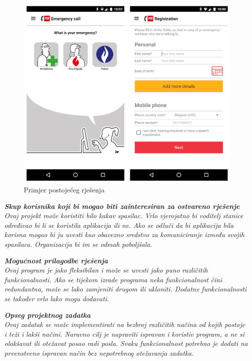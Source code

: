 		\begin{figure}[H]
			\includegraphics[scale=0.5]{slike/112-app-options.PNG}
			\centering
			\caption{Primjer postojećeg rješenja}
			\label{fig:112_BE}
			\end{figure}
		
		\textbf{\textit{Skup korisnika koji bi mogao biti zainteresiran za ostvareno rješenje}}\\
		\textit{Ovaj projekt može koristiti bilo kakav spasilac. Vrlo vjerojatno bi voditelj stanice određivao bi li se koristila aplikacija ili ne. Ako se odluči da bi aplikacija bila korisna mogao bi ju uvesti kao obavezno sredstvo za komuniciranje između svojih spasilaca. Organizacija bi im se odmah poboljšala.}
		
		\textbf{\textit{Mogućnost prilagodbe rješenja}}\\
		\textit{Ovaj program je jako fleksibilan i može se uvesti jako puno različitih funkcionalnosti. Ako se tijekom izrade programa neka funkcionalnost čini redundantna, može se lako zamjeniti drugom ili ukloniti. Dodatne funkcionalnosti se također vrlo lako mogu dodavati.}
		
		\textbf{\textit{Opseg projektnog zadatka}}\\
		\textit{Ovaj zadatak se može implementirati na bezbroj različitih načina od kojih postoje i teži i lakši načini. Naravno cilj je napraviti ispravan i koristiv program, a ne si olakšavat ili otežavat posao radi posla. Svaku funkcionalnost potrebno je dodati na prvenstveno ispravan način bez nepotrebnog otežavanja zadatka.}
		
